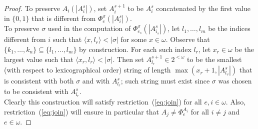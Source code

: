\documentclass{article}
\begin{document}
\begin{proof}
    To preserve $A_{i}(|A_{i}^s|)$, set $A_{i}^{s+1}$ to be
    $A_{i}^s$ concatenated by the first value in $\{0,1\}$ that is
    different from $\Phi_{e}^\sigma (|A_{i}^s|)$. \\

    To preserve $\sigma$ used in the computation of $\Phi_{e_s}^\sigma
    (|A_{i_s}^s|)$, let $l_1,\ldots,l_m$ be the indices different from $i$
    such that $\langle x,l_r\rangle <|\sigma|$ for some $x\in\omega$.
    Observe that $\{k_1,\ldots,k_n\}\subseteq \{l_1,\ldots,l_m\}$ by
    construction. For each such index $l_r$, let $x_r\in\omega$ be the
    largest value such that $\langle x_r,l_r\rangle <|\sigma|$. Then set
    $A_{l_r}^{s+1}\in 2^{<\omega}$ to be the smallest (with respect to
    lexicographical order) string of length $\max(x_r+1,|A_{l_v}^s|)$ that
    is consistent with both $\sigma$ and with $A_{l_r}^s$; such string must
    exist since $\sigma$ was chosen to be consistent with $A_{l_r}^s$. \\

    Clearly this construction will satisfy restriction~(\ref{eq:join})
    for all $e,i\in\omega$. Also, restriction~(\ref{eq:join}) will ensure
    in particular that $A_j\neq \Phi_e^{A_i}$ for all $i\neq j$ and
    $e\in\omega$. 




\end{proof}
\end{document}
